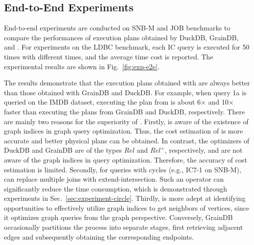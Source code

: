 \subsection{End-to-End Experiments}
\label{sec:experiment-e2e}

End-to-end experiments are conducted on SNB-M and JOB benchmarks to compare the performances of execution plans obtained by DuckDB, GrainDB, and \relgo.
For experiments on the LDBC benchmark, each IC query is executed for 50 times with different times, and the average time cost is reported.
The experimental results are shown in Fig.~\ref{fig:exp-e2e}.

The results demonstrate that the execution plans obtained with \relgo are always better than those obtained with GrainDB and DuckDB.
For example, when query 1a is queried on the IMDB dataset, executing the plan from \relgo is about 6$\times$ and 10$\times$ faster than executing the plans from GrainDB and DuckDB, respectively.
There are mainly two reasons for the superiority of \relgo.
Firstly, \relgo is aware of the existence of graph indices in graph query optimization.
Thus, the cost estimation of \relgo is more accurate and better physical plans can be obtained.
In contrast, the optimizers of DuckDB and GrainDB are of the types $Rel$ and $Rel^+$, respectively, and are not aware of the graph indices in query optimization.
Therefore, the accuracy of cost estimation is limited.
Secondly, for queries with cycles (e.g., IC7-1 on SNB-M), \relgo can replace multiple joins with extend-intersection.
Such an operator can significantly reduce the time consumption, which is demonstrated through experiments in Sec.~\ref{sec:experiment-circle}.
Thirdly, \relgo is more adept at identifying opportunities to effectively utilize graph indices to get neighbors of vertices, since it optimizes graph queries from the graph perspective.
Conversely, GrainDB occasionally partitions the process into separate stages, first retrieving adjacent edges and subsequently obtaining the corresponding endpoints.
